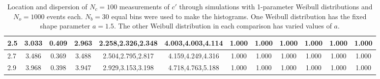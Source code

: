 \begin{table*}[h]
\begin{center}
\begin{tabular}{| l | c | c | c | c | c | c | c | c | c | c | c |}
2.5 & 3.033 & 0.409 & 2.963 & 2.258,2.326,2.348 & 4.003,4.003,4.114  & 1.000  & 1.000  & 1.000  & 1.000  & 1.000  & 1.000 \\\hline
2.7 & 3.486 & 0.369 & 3.488 & 2.504,2.795,2.817 & 4.159,4.249,4.316  & 1.000  & 1.000  & 1.000  & 1.000  & 1.000  & 1.000 \\\hline
2.9 & 3.968 & 0.398 & 3.947 & 2.929,3.153,3.198 & 4.718,4.763,5.188  & 1.000  & 1.000  & 1.000  & 1.000  & 1.000  & 1.000 \\\hline
\end{tabular}
\caption{Location and dispersion of $N_c=100$
measurements of $c'$ through simulations
with 1-parameter Weibull distributions and $N_o=1000$ events each.
$N_b=30$ equal bins were used to make the histograms.
One Weibull distribution has the fixed shape parameter $a=1.5$.
The other Weibull distribution in each comparison
has varied values of $a$.}
\end{center}
\end{table*}
